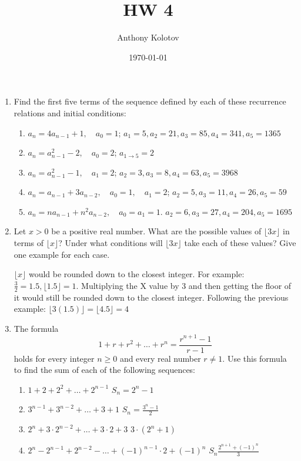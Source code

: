 \documentclass{article}
\title{HW 4}
\date{\today}
\author{Anthony Kolotov}
\begin{document}
	
	\maketitle
	

	
	\begin{enumerate}
		\item Find the first five terms of the sequence defined by each of these recurrence relations and initial conditions:
		\begin{enumerate}
			\item $a_n = 4a_{n-1} + 1, \quad a_0 = 1$;
			\subitem $a_1=5, a_2 = 21, a_3 = 85, a_4 = 341, a_5 = 1365$
			\item $a_n = a_{n-1}^2 - 2, \quad a_0 = 2$;
			\subitem $a_{1\rightarrow 5}=2$
			\item $a_n = a_{n-1}^2 - 1, \quad a_1 = 2$;
			\subitem $ a_2=3, a_3 = 8, a_4 = 63, a_5 = 3968 $
			\item $a_n = a_{n-1} + 3a_{n-2}, \quad a_0 = 1, \quad a_1 = 2$;
			\subitem $ a_2 = 5, a_3 = 11, a_4 = 26, a_5 = 59$
			\item $a_n = n a_{n-1} + n^2 a_{n-2}, \quad a_0 = a_1 = 1$.
			\subitem $ a_2 = 6 , a_3 = 27, a_4 = 204, a_5 = 1695$
		\end{enumerate}
		
		\item Let $x > 0$ be a positive real number. What are the possible values of $\lfloor 3x \rfloor$ in terms of $\lfloor x \rfloor$? Under what conditions will $\lfloor 3x \rfloor$ take each of these values? Give one example for each case.
		
		\subitem $\lfloor x \rfloor$ would be rounded down to the closest integer. For example: $\frac{3}{2} = 1.5, \lfloor 1.5 \rfloor = 1.$ Multiplying the X value by 3 and then getting the floor of it would still be rounded down to the closest integer. Following the previous example: $ \lfloor3(1.5)\rfloor = \lfloor4.5\rfloor = 4$ 
		
		
		\item The formula
		\[
		1 + r + r^2 + \dots + r^n = \frac{r^{n+1} - 1}{r - 1}
		\]
		holds for every integer $n \geq 0$ and every real number $r \neq 1$. Use this formula to find the sum of each of the following sequences:
		\begin{enumerate}
			\item $1 + 2 + 2^2 + \dots + 2^{n-1}$
				\subitem $S_n = 2^n - 1$
			\item $3^{n-1} + 3^{n-2} + \dots + 3 + 1$
				\subitem $S_n = \frac{3^{n}-1}{2} $
			\item $2^n + 3 \cdot 2^{n-2} + \dots + 3 \cdot 2 + 3$
				\subitem $3\cdot(2^{n}+1)$
			\item $2^n - 2^{n-1} + 2^{n-2} - \dots + (-1)^{n-1} \cdot 2 + (-1)^n$
				\subitem $S_n \frac{2^{n+1}+(-1)^n}{3}$
		\end{enumerate}
		

\end{enumerate}
\end{document}
